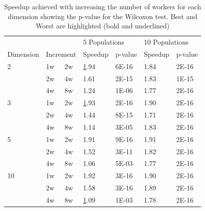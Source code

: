 \documentclass[review]{elsarticle}
\begin{document}
\begin{table}[h!tbp]
  \small
  \caption{Speedup achieved with increasing the number of workers for
    each dimension showing the p-value for the Wilcoxon test. Best and Worst are highlighted (bold and underlined) }
  \label{tab:speedup:test}
  \vspace{0.25cm}
  \centering
  \begin{tabular}{lllllll}
            &               &               & \multicolumn{2}{l}{5 Populations} & \multicolumn{2}{l}{10 Populations} \\
  Dimension & \multicolumn{2}{l}{Increment} & Speedup         & p-value         & Speedup          & p-value         \\
  2         & 1w            & 2w            & {\ul 1.94}            & 6E-16           & 1.84             & 2E-16           \\
            & 2w            & 4w            & 1.61            & 2E-15           & 1.83             & 1E-15           \\
            & 4w            & 8w            & 1.24            & 1E-06           & 1.77             & 2E-16           \\
  3         & 1w            & 2w            & {\ul 1.93}            & 2E-16           & 1.90             & 2E-16           \\
            & 2w            & 4w            & 1.44            & 8E-15           & 1.71             & 2E-16           \\
            & 4w            & 8w            & 1.14            & 3E-05           & 1.83             & 2E-16           \\
  5         & 1w            & 2w            & 1.91            & 9E-16           & 1.91             & 2E-16           \\
            & 2w            & 4w            & 1.52            & 3E-11           & 1.82             & 2E-16           \\
            & 4w            & 8w            & 1.06            & 5E-03           & 1.77             & 2E-16           \\
  10        & 1w            & 2w            & 1.92            & 3E-16           & 1.90             & 2E-16           \\
            & 2w            & 4w            & 1.58            & 3E-16           & 1.89             & 2E-16           \\
            & 4w            & 8w            & {\ul 1.09}      & 1E-03           & 1.78             & 2E-16           \\

\end{tabular}
\end{table}
\end{document}
